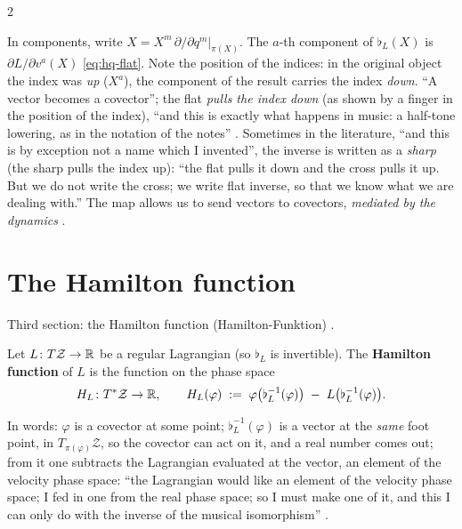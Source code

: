 \begin{paracol}{2}
\begin{remark}\label{rem:hq-music}
In components, write $X=X^m\,\partial/\partial q^m|_{\pi(X)}$. The $a$-th component of $\flat_L(X)$ is $\partial L/\partial v^a(X)$ \eqref{eq:hq-flat}. Note the position of the indices: in the original object the index was \emph{up} ($X^a$), the component of the result carries the index \emph{down}. ``A vector becomes a covector''; the flat \emph{pulls the index down} (as shown by a finger in the position of the index), ``and this is exactly what happens in music: a half-tone lowering, as in the notation of the notes'' . Sometimes in the literature, ``and this is by exception not a name which I invented'', the inverse is written as a \emph{sharp} (the sharp pulls the index up): ``the flat pulls it down and the cross pulls it up. But we do not write the cross; we write flat inverse, so that we know what we are dealing with.'' The map allows us to send vectors to covectors, \emph{mediated by the dynamics} .
\end{remark}

\section{The Hamilton function}\label{sec:hq-hamilton}

Third section: the Hamilton function (Hamilton-Funktion) .

\begin{definition}\label{def:hq-hamilton}
Let $L\colon T\mathcal Z\to\mathbb{R}$ be a regular Lagrangian (so $\flat_L$ is invertible). The \textbf{Hamilton function} of $L$ is the function on the phase space
\begin{equation}\label{eq:hq-H}
  H_L\colon T^*\mathcal Z\to\mathbb{R},\qquad H_L(\varphi)\;:=\;\varphi\bigl(\flat_L^{-1}(\varphi)\bigr)\;-\;L\bigl(\flat_L^{-1}(\varphi)\bigr).
\end{equation}
\end{definition}
In words: $\varphi$ is a covector at some point; $\flat_L^{-1}(\varphi)$ is a vector at the \emph{same} foot point, in $T_{\pi(\varphi)}\mathcal Z$, so the covector can act on it, and a real number comes out; from it one subtracts the Lagrangian evaluated at the vector, an element of the velocity phase space: ``the Lagrangian would like an element of the velocity phase space; I fed in one from the real phase space; so I must make one of it, and this I can only do with the inverse of the musical isomorphism'' .


\end{paracol}
